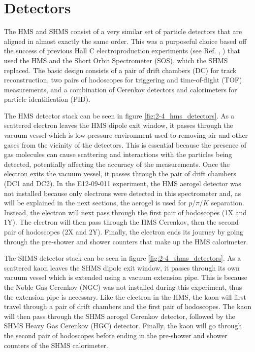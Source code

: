 \documentclass[
]{report}
\begin{document}
\hypertarget{Section-4.5}{%
\section{Detectors}\label{Section-4.5}}

\label{sec:chap_3_detectors}

The HMS and SHMS consist of a very similar set of particle detectors
that are aligned in almost exactly the same order. This was a purposeful
choice based off the success of previous Hall C electroproduction
experiments (see Ref. \cite{horn_determination_2006},
\cite{blok_charged_2008}) that used the HMS and the Short Orbit
Spectrometer (SOS), which the SHMS replaced. The basic design consists
of a pair of drift chambers (DC) for track reconstruction, two pairs of
hodoscopes for triggering and time-of-flight (TOF) measurements, and a
combination of Cerenkov detectors and calorimeters for particle
identification (PID).



The HMS detector stack can be seen in figure
\ref{fig:2-4_hms_detectors}. As a scattered electron leaves the HMS
dipole exit window, it passes through the vacuum vessel which is
low-pressure environment used to removing air and other gases from the
vicinity of the detectors. This is essential because the presence of gas
molecules can cause scattering and interactions with the particles being
detected, potentially affecting the accuracy of the measurements. Once
the electron exits the vacuum vessel, it passes through the pair of
drift chambers (DC1 and DC2). In the E12-09-011 experiment, the HMS
aerogel detector was not installed because only electrons were detected
in this spectrometer and, as will be explained in the next sections, the
aerogel is used for \(p\)/\(\pi\)/\(K\) separation. Instead, the
electron will next pass through the first pair of hodoscopes (1X and
1Y). The electron will then pass through the HMS Cerenkov, then the
second pair of hodoscopes (2X and 2Y). Finally, the electron ends its
journey by going through the pre-shower and shower counters that make up
the HMS calorimeter.



The SHMS detector stack can be seen in figure
\ref{fig:2-4_shms_detectors}. As a scattered kaon leaves the SHMS dipole
exit window, it passes through its own vacuum vessel which is extended
using a vacuum extension pipe. This is because the Noble Gas Cerenkov
(NGC) was not installed during this experiment, thus the extension pipe
is necessary. Like the electron in the HMS, the kaon will first travel
through a pair of drift chambers and the first pair of hodoscopes. The
kaon will then pass through the SHMS aerogel Cerenkov detector, followed
by the SHMS Heavy Gas Cerenkov (HGC) detector. Finally, the kaon will go
through the second pair of hodoscopes before ending in the pre-shower
and shower counters of the SHMS calorimeter.
\end{document}
